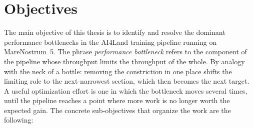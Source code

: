 \documentclass[12pt,a4paper]{article}
\begin{document}
\section{Objectives}

The main objective of this thesis is to identify and resolve the dominant performance
bottlenecks in the AI4Land training pipeline running on MareNostrum~5. The phrase
\emph{performance bottleneck} refers to the component of the pipeline whose throughput limits
the throughput of the whole. By analogy with the neck of a bottle: removing the constriction
in one place shifts the limiting role to the next-narrowest section, which then becomes the
next target. A useful optimization effort is one in which the bottleneck moves several
times, until the pipeline reaches a point where more work is no longer worth the expected
gain. The concrete sub-objectives that organize the work are the following:
\end{document}
